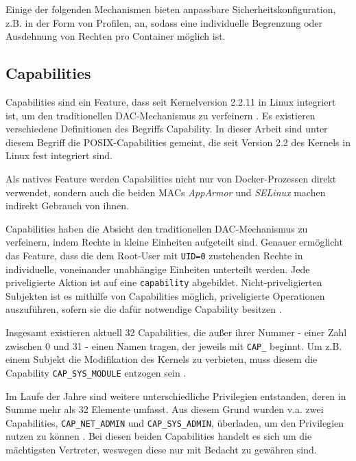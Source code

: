 \documentclass[../main.tex]{subfiles}
\begin{document}
{		Einige der folgenden Mechanismen bieten anpassbare Sicherheitskonfiguration, z.B. in der Form von Profilen, an, sodass eine individuelle Begrenzung oder Ausdehnung von Rechten pro Container möglich ist.

    \subsection{Capabilities}
		\label{capabilities}
			Capabilities sind ein Feature, dass seit Kernelversion 2.2.11 in Linux integriert ist, um den traditionellen DAC-Mechanismus zu verfeinern \cite[S.42]{SELinuxApparmor}. Es existieren verschiedene Definitionen des Begriffs \glqq{}Capability\grqq{}. In dieser Arbeit sind unter diesem Begriff die POSIX-Capabilities gemeint, die seit Version 2.2 des Kernels in Linux fest integriert sind.

			Als natives Feature werden Capabilities nicht nur von Docker-Prozessen direkt verwendet, sondern auch die beiden MACs \emph{AppArmor} und \emph{SELinux} machen indirekt Gebrauch von ihnen.

			Capabilities haben die Absicht den traditionellen DAC-Mechanismus zu verfeinern, indem Rechte in kleine Einheiten aufgeteilt sind. Genauer ermöglicht das Feature, dass die dem Root-User mit \texttt{UID=0} zustehenden Rechte in individuelle, voneinander unabhängige Einheiten unterteilt werden. Jede priveligierte Aktion ist auf eine \texttt{capability} abgebildet. Nicht-priveligierten Subjekten ist es mithilfe von Capabilities möglich, priveligierte Operationen auszuführen, sofern sie die dafür notwendige Capability besitzen \cite[S.33]{linuxInterface}\cite[S.39]{SELinuxApparmor}.

			Insgesamt existieren aktuell 32 Capabilities, die außer ihrer Nummer - einer Zahl zwischen 0 und 31 - einen Namen tragen, der jeweils mit \texttt{CAP\_} beginnt. Um z.B. einem Subjekt die Modifikation des Kernels zu verbieten, muss diesem die Capability \texttt{CAP\_SYS\_MODULE} entzogen sein \cite[S.42]{SELinuxApparmor}.

			Im Laufe der Jahre sind weitere unterschiedliche Privilegien entstanden, deren in Summe mehr als 32 Elemente umfasst. Aus diesem Grund wurden v.a. zwei Capabilities, \texttt{CAP\_NET\_ADMIN} und \texttt{CAP\_SYS\_ADMIN}, überladen, um den Privilegien nutzen zu können \cite[S.40f.]{SELinuxApparmor}. Bei diesen beiden Capabilities handelt es sich um die mächtigsten Vertreter, weswegen diese nur mit Bedacht zu gewähren sind.

}
\end{document}
